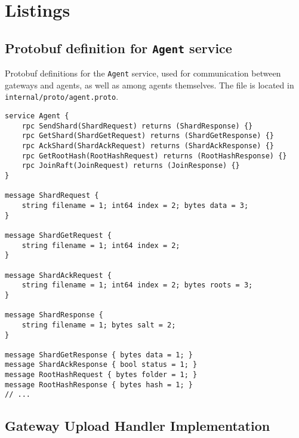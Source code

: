 \appendix

\chapter{Listings}

\section{Protobuf definition for \texttt{Agent} service} \label{code:protobuf-for-agent}
\begin{listing}[H]
\caption{Protobuf definitions for the \texttt{Agent} service, used for communication between gateways and agents, as well as among agents themselves. The file is located in \texttt{internal/proto/agent.proto}.}
\begin{verbatim}
service Agent {
    rpc SendShard(ShardRequest) returns (ShardResponse) {}
    rpc GetShard(ShardGetRequest) returns (ShardGetResponse) {}
    rpc AckShard(ShardAckRequest) returns (ShardAckResponse) {}
    rpc GetRootHash(RootHashRequest) returns (RootHashResponse) {}
    rpc JoinRaft(JoinRequest) returns (JoinResponse) {}
}

message ShardRequest {
    string filename = 1; int64 index = 2; bytes data = 3;
}

message ShardGetRequest {
    string filename = 1; int64 index = 2;
}

message ShardAckRequest {
    string filename = 1; int64 index = 2; bytes roots = 3;
}

message ShardResponse {
    string filename = 1; bytes salt = 2;
}

message ShardGetResponse { bytes data = 1; }
message ShardAckResponse { bool status = 1; }
message RootHashRequest { bytes folder = 1; }
message RootHashResponse { bytes hash = 1; }
// ...
\end{verbatim}
\end{listing}


\section{Gateway Upload Handler Implementation} \label{code:upload-handler}

